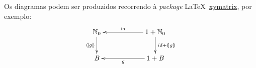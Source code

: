 \documentclass[a4paper]{article}
\newcommand{\Varid}[1]{\mathit{#1}}
\begin{document}
Os diagramas podem ser produzidos recorrendo à \emph{package} \LaTeX\
\href{https://ctan.org/pkg/xymatrix}{xymatrix}, por exemplo:
\begin{eqnarray*}
\xymatrix@C=2cm{
    \ensuremath{\N_0}
           \ar[d]_-{\ensuremath{\cata{\Varid{g}}}}
&
    \ensuremath{\mathrm{1}\mathbin{+}\N_0}
           \ar[d]^{\ensuremath{\Varid{id}\mathbin{+}\cata{\Varid{g}}}}
           \ar[l]_-{\ensuremath{\mathsf{in}}}
\\
     \ensuremath{\mathit B}
&
     \ensuremath{\mathrm{1}\mathbin{+}\mathit B}
           \ar[l]^-{\ensuremath{\Varid{g}}}
}
\end{eqnarray*}



\printindex



\end{document}
